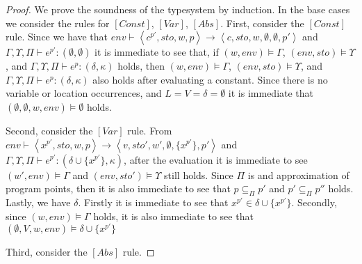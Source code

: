 \documentclass[../../master.tex]{subfiles}
\begin{document}
\begin{proof}
	We prove the soundness of the typesystem by induction. In the base cases we consider the rules for $[Const]$, $[Var]$, $[Abs]$.
	First, consider the $[Const]$ rule.
	Since we have that $env\vdash\left\langle c^{p'},sto,w,p\right\rangle\rightarrow\left\langle c,sto,w,\emptyset,\emptyset,p'\right\rangle$ and $\Gamma,\Upsilon,\Pi\vdash e^{p'}:(\emptyset,\emptyset)$ it is immediate to see that, if $(w,env)\models\Gamma$, $(env,sto)\models\Upsilon$, and $\Gamma,\Upsilon,\Pi\vdash e^p:(\delta,\kappa)$ holds, then $(w,env)\models\Gamma$, $(env,sto)\models\Upsilon$, and $\Gamma,\Upsilon,\Pi\vdash e^p:(\delta,\kappa)$ also holds after evaluating a constant.
	Since there is no variable or location occurrences, and $L=V=\delta=\emptyset$ it is immediate that $(\emptyset,\emptyset,w,env)\models\emptyset$ holds. 

	Second, consider the $[Var]$ rule.
	From $env\vdash\left\langle x^{p'},sto,w,p\right\rangle\rightarrow\left\langle v,sto',w',\emptyset,\{x^{p'}\},p'\right\rangle$ and $\Gamma,\Upsilon,\Pi\vdash e^{p'}:(\delta\cup\{x^{p'}\},\kappa)$, after the evaluation it is immediate to see $(w',env)\models\Gamma$ and $(env,sto')\models\Upsilon$ still holds.
	Since $\Pi$ is and approximation of program points, then it is also immediate to see that $p\subseteq_\Pi p'$ and $p'\subseteq_\Pi p''$ holds.
	Lastly, we have $\delta$.
	Firstly it is immediate to see that $x^{p'}\in\delta\cup\{x^{p'}\}$.
	Secondly, since $(w,env)\models\Gamma$ holds, it is also immediate to see that $(\emptyset,V,w,env)\models\delta\cup\{x^{p'}\}$


	Third, consider the $[Abs]$ rule.
\end{proof}
\fi
\end{document}

